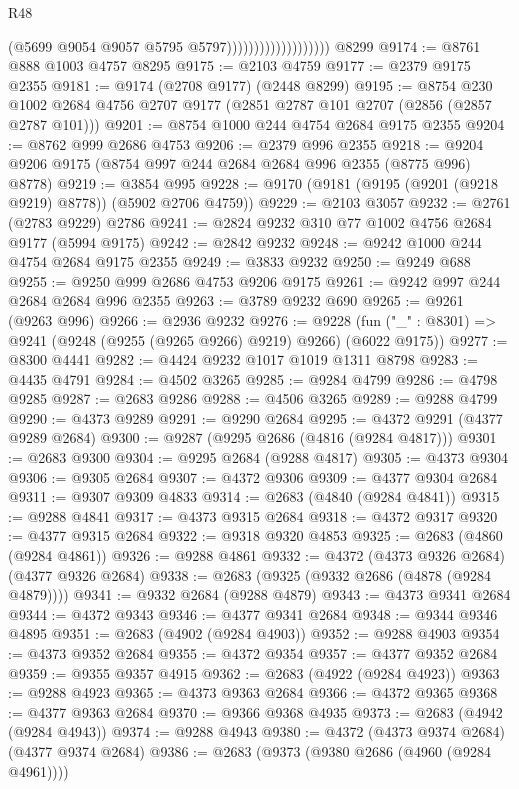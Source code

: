 \begin{lexlean}{R48}
\begin{coremodule}
                                        (@5699 @9054 @9057 @5795 @5797)))))))))))))))))))
    @8299
@9174 := @8761 @888 @1003 @4757 @8295
@9175 := @2103 @4759
@9177 := @2379 @9175 @2355
@9181 := @9174 (@2708 @9177) (@2448 @8299)
@9195 := @8754
    @230
    @1002
    @2684
    @4756
    @2707
    @9177
    (@2851 @2787 @101 @2707 (@2856 (@2857 @2787 @101)))
@9201 := @8754 @1000 @244 @4754 @2684 @9175 @2355
@9204 := @8762 @999 @2686 @4753
@9206 := @2379 @996 @2355
@9218 := @9204 @9206 @9175 (@8754 @997 @244 @2684 @2684 @996 @2355 (@8775 @996) @8778)
@9219 := @3854 @995
@9228 := @9170 (@9181 (@9195 (@9201 (@9218 @9219) @8778)) (@5902 @2706 @4759))
@9229 := @2103 @3057
@9232 := @2761 (@2783 @9229) @2786
@9241 := @2824 @9232 @310 @77 @1002 @4756 @2684 @9177 (@5994 @9175)
@9242 := @2842 @9232
@9248 := @9242 @1000 @244 @4754 @2684 @9175 @2355
@9249 := @3833 @9232
@9250 := @9249 @688
@9255 := @9250 @999 @2686 @4753 @9206 @9175
@9261 := @9242 @997 @244 @2684 @2684 @996 @2355
@9263 := @3789 @9232 @690
@9265 := @9261 (@9263 @996)
@9266 := @2936 @9232
@9276 := @9228 (fun ("_" : @8301) => @9241 (@9248 (@9255 (@9265 @9266) @9219) @9266) (@6022 @9175))
@9277 := @8300 @4441
@9282 := @4424 @9232 @1017 @1019 @1311 @8798
@9283 := @4435 @4791
@9284 := @4502 @3265
@9285 := @9284 @4799
@9286 := @4798 @9285
@9287 := @2683 @9286
@9288 := @4506 @3265
@9289 := @9288 @4799
@9290 := @4373 @9289
@9291 := @9290 @2684
@9295 := @4372 @9291 (@4377 @9289 @2684)
@9300 := @9287 (@9295 @2686 (@4816 (@9284 @4817)))
@9301 := @2683 @9300
@9304 := @9295 @2684 (@9288 @4817)
@9305 := @4373 @9304
@9306 := @9305 @2684
@9307 := @4372 @9306
@9309 := @4377 @9304 @2684
@9311 := @9307 @9309 @4833
@9314 := @2683 (@4840 (@9284 @4841))
@9315 := @9288 @4841
@9317 := @4373 @9315 @2684
@9318 := @4372 @9317
@9320 := @4377 @9315 @2684
@9322 := @9318 @9320 @4853
@9325 := @2683 (@4860 (@9284 @4861))
@9326 := @9288 @4861
@9332 := @4372 (@4373 @9326 @2684) (@4377 @9326 @2684)
@9338 := @2683 (@9325 (@9332 @2686 (@4878 (@9284 @4879))))
@9341 := @9332 @2684 (@9288 @4879)
@9343 := @4373 @9341 @2684
@9344 := @4372 @9343
@9346 := @4377 @9341 @2684
@9348 := @9344 @9346 @4895
@9351 := @2683 (@4902 (@9284 @4903))
@9352 := @9288 @4903
@9354 := @4373 @9352 @2684
@9355 := @4372 @9354
@9357 := @4377 @9352 @2684
@9359 := @9355 @9357 @4915
@9362 := @2683 (@4922 (@9284 @4923))
@9363 := @9288 @4923
@9365 := @4373 @9363 @2684
@9366 := @4372 @9365
@9368 := @4377 @9363 @2684
@9370 := @9366 @9368 @4935
@9373 := @2683 (@4942 (@9284 @4943))
@9374 := @9288 @4943
@9380 := @4372 (@4373 @9374 @2684) (@4377 @9374 @2684)
@9386 := @2683 (@9373 (@9380 @2686 (@4960 (@9284 @4961))))

\end{coremodule}
\end{lexlean}
